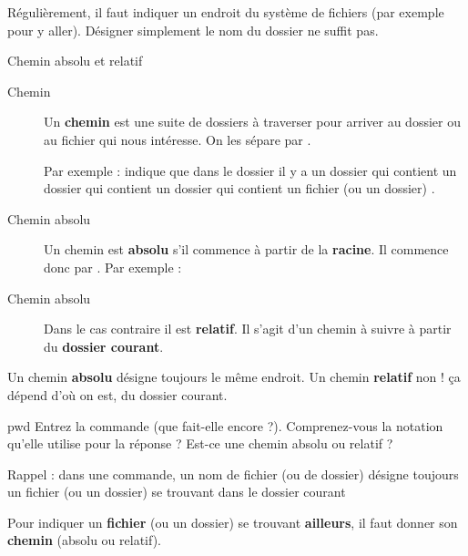 \documentclass[a4paper,11pt]{style-esi/td}
\begin{document}
		
		\bigskip
		Régulièrement, il faut indiquer un endroit du système de fichiers 
		(par exemple pour y aller). 
		Désigner simplement le nom du dossier ne suffit pas.  

		\begin{theorie}{Chemin absolu et relatif}
			\begin{description}
			\item[Chemin]
				Un \textbf{chemin} est une suite de dossiers à traverser 
				pour arriver au dossier ou au fichier qui nous intéresse.
				On les sépare par \og{}\samp{/}\fg{}.

				Par exemple : 
				indique que dans le dossier 
				il y a un dossier 
				qui contient un dossier  
				qui contient un dossier  
				qui contient un fichier (ou un dossier) .
			\item[Chemin absolu]
				Un chemin est \textbf{absolu} 
				s'il commence à partir de la \textbf{racine}.
				Il commence donc par \og{}\samp{/}\fg{}.
				Par exemple : 
			\item[Chemin absolu]
				Dans le cas contraire il est \textbf{relatif}.
				Il s'agit d'un chemin à suivre à partir du \textbf{dossier courant}.
			\end{description}
		\end{theorie}

		\begin{alertbox}
			Un chemin \textbf{absolu} désigne toujours le même endroit.
			Un chemin \textbf{relatif} non ! \c ca dépend d'où on est,
			du dossier courant.
		\end{alertbox}

		\begin{Exercice}{pwd}
			Entrez la commande  (que fait-elle encore ?). 
			Comprenez-vous la notation qu'elle utilise pour la réponse ?
			Est-ce une chemin absolu ou relatif ?
		\end{Exercice}

		\begin{infobox}
			Rappel : dans une commande, un nom de fichier (ou de dossier)
			désigne toujours un fichier (ou un dossier) se trouvant
			dans le dossier courant
	
			Pour indiquer un \textbf{fichier} (ou un dossier) 
			se trouvant \textbf{ailleurs},
			il faut donner son \textbf{chemin} (absolu ou relatif).
		\end{infobox}
\end{document}
